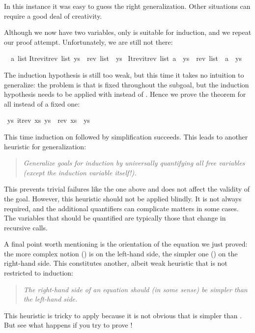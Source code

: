 \begin{isabellebody}
\begin{isamarkuptxt}
In this instance it was easy to guess the right generalization.
Other situations can require a good deal of creativity.  

Although we now have two variables, only  is suitable for
induction, and we repeat our proof attempt. Unfortunately, we are still
not there:
\begin{isabelle}%
\ {}{\isachardot}\ {\isasymAnd}a\ list{\isachardot}\isanewline
{}Itrev{\isachardot}itrev\ list\ ys\ {\isacharequal}\ rev\ list\ {\isacharat}\ ys\ {\isasymLongrightarrow}\isanewline
{}Itrev{\isachardot}itrev\ list\ {\isacharparenleft}a\ {\isacharhash}\ ys{\isacharparenright}\ {\isacharequal}\ rev\ list\ {\isacharat}\ a\ {\isacharhash}\ ys%
\end{isabelle}
The induction hypothesis is still too weak, but this time it takes no
intuition to generalize: the problem is that  is fixed throughout
the subgoal, but the induction hypothesis needs to be applied with
 instead of . Hence we prove the theorem
for all  instead of a fixed one:%
\end{isamarkuptxt}%
\isamarkuptrue%
%
\endisatagproof
{\isafoldproof}%
%
\isadelimproof
%
\endisadelimproof
{}\isamarkupfalse%
\ {\isachardoublequoteopen}{\isasymforall}ys{\isachardot}\ itrev\ xs\ ys\ {\isacharequal}\ rev\ xs\ {\isacharat}\ ys{\isachardoublequoteclose}%
\isadelimproof
%
\endisadelimproof
%
\isatagproof
%
\endisatagproof
{\isafoldproof}%
%
\isadelimproof
%
\endisadelimproof
%
\begin{isamarkuptext}%
\noindent
This time induction on  followed by simplification succeeds. This
leads to another heuristic for generalization:
\begin{quote}
\emph{Generalize goals for induction by universally quantifying all free
variables {\em(except the induction variable itself!)}.}
\end{quote}
This prevents trivial failures like the one above and does not affect the
validity of the goal.  However, this heuristic should not be applied blindly.
It is not always required, and the additional quantifiers can complicate
matters in some cases. The variables that should be quantified are typically
those that change in recursive calls.

A final point worth mentioning is the orientation of the equation we just
proved: the more complex notion () is on the left-hand
side, the simpler one () on the right-hand side. This constitutes
another, albeit weak heuristic that is not restricted to induction:
\begin{quote}
  \emph{The right-hand side of an equation should (in some sense) be simpler
    than the left-hand side.}
\end{quote}
This heuristic is tricky to apply because it is not obvious that
 is simpler than . But see what
happens if you try to prove !


\end{isamarkuptext}
\end{isabellebody}
